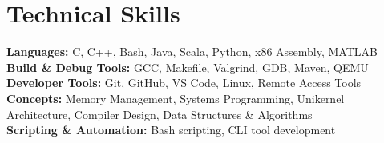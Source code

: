\documentclass[letterpaper,11pt]{article}
\begin{document}
\section{Technical Skills}
 \begin{itemize}[leftmargin=0.15in, label={}]
    \small{\item{
     \textbf{Languages:}{ C, C++, Bash, Java, Scala, Python, x86 Assembly, MATLAB} \\
     \textbf{Build \& Debug Tools:}{ GCC, Makefile, Valgrind, GDB, Maven, QEMU} \\
     \textbf{Developer Tools:}{ Git, GitHub, VS Code, Linux, Remote Access Tools} \\
     \textbf{Concepts:}{ Memory Management, Systems Programming, Unikernel Architecture, Compiler Design, Data Structures \& Algorithms} \\
     \textbf{Scripting \& Automation:}{ Bash scripting, CLI tool development}
    }}
 \end{itemize}


\end{document}
